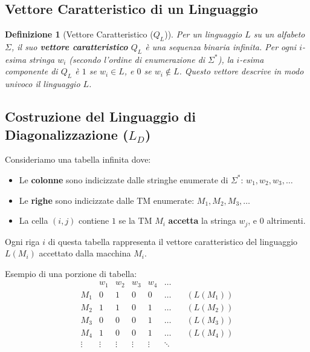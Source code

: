\documentclass[a4paper]{article}
\newtheorem{definition}{Definizione}
\begin{document}
\subsection{Vettore Caratteristico di un Linguaggio}

\begin{definition}[Vettore Caratteristico ($Q_L$)]
Per un linguaggio $L$ su un alfabeto $\Sigma$, il suo \textbf{vettore caratteristico} $Q_L$ è una sequenza binaria infinita. Per ogni $i$-esima stringa $w_i$ (secondo l'ordine di enumerazione di $\Sigma^*$), la $i$-esima componente di $Q_L$ è $1$ se $w_i \in L$, e $0$ se $w_i \notin L$. Questo vettore descrive in modo univoco il linguaggio $L$.
\end{definition}

\subsection{Costruzione del Linguaggio di Diagonalizzazione ($L_D$)}

Consideriamo una tabella infinita dove:
\begin{itemize}
    \item Le \textbf{colonne} sono indicizzate dalle stringhe enumerate di $\Sigma^*$: $w_1, w_2, w_3, \dots$
    \item Le \textbf{righe} sono indicizzate dalle TM enumerate: $M_1, M_2, M_3, \dots$
    \item La cella $(i, j)$ contiene $1$ se la TM $M_i$ \textbf{accetta} la stringa $w_j$, e $0$ altrimenti.
\end{itemize}
Ogni riga $i$ di questa tabella rappresenta il vettore caratteristico del linguaggio $L(M_i)$ accettato dalla macchina $M_i$.

Esempio di una porzione di tabella:
\[
\begin{array}{c|cccccc}
        & w_1 & w_2 & w_3 & w_4 & \dots \\
    \hline
    M_1 & 0 & 1 & 0 & 0 & \dots & \quad (L(M_1)) \\
    M_2 & 1 & 1 & 0 & 1 & \dots & \quad (L(M_2)) \\
    M_3 & 0 & 0 & 0 & 1 & \dots & \quad (L(M_3)) \\
    M_4 & 1 & 0 & 0 & 1 & \dots & \quad (L(M_4)) \\
    \vdots & \vdots & \vdots & \vdots & \vdots & \ddots \\
\end{array}
\]
\end{document}
